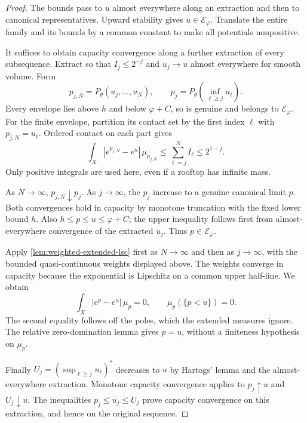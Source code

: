 \begin{proof}
The bounds pass to $u$ almost everywhere along an extraction and then to canonical representatives. Upward stability gives $u\in\mathcal E_\varphi$. Translate the entire family and its bounds by a common constant to make all potentials nonpositive.

It suffices to obtain capacity convergence along a further extraction of every subsequence. Extract so that $I_j\leq2^{-j}$ and $u_j\to u$ almost everywhere for smooth volume. Form
\[
 p_{j,N}=P_\theta(u_j,\ldots,u_N),\qquad
 p_j=P_\theta\left(\inf_{\ell\geq j}u_\ell\right).
\]
Every envelope lies above $h$ and below $\varphi+C$, so is genuine and belongs to $\mathcal E_\varphi$. For the finite envelope, partition its contact set by the first index $\ell$ with $p_{j,N}=u_\ell$. Ordered contact on each part gives
\[
 \int_X|e^{p_{j,N}}-e^u|\,\mu_{p_{j,N}}
 \leq\sum_{\ell=j}^N I_\ell\leq2^{1-j}.
\]
Only positive integrals are used here, even if a rooftop has infinite mass.

As $N\to\infty$, $p_{j,N}\downarrow p_j$. As $j\to\infty$, the $p_j$ increase to a genuine canonical limit $p$. Both convergences hold in capacity by monotone truncation with the fixed lower bound $h$. Also $h\leq p\leq u\leq\varphi+C$; the upper inequality follows first from almost-everywhere convergence of the extracted $u_j$. Thus $p\in\mathcal E_\varphi$.

Apply \cref{lem:weighted-extended-lsc} first as $N\to\infty$ and then as $j\to\infty$, with the bounded quasi-continuous weights displayed above. The weights converge in capacity because the exponential is Lipschitz on a common upper half-line. We obtain
\[
 \int_X|e^p-e^u|\,\mu_p=0,
 \qquad \mu_p(\{p<u\})=0.
\]
The second equality follows off the poles, which the extended measures ignore. The relative zero-domination lemma gives $p=u$, without a finiteness hypothesis on $\mu_p$.

Finally $U_j=(\sup_{\ell\geq j}u_\ell)^*$ decreases to $u$ by Hartogs' lemma and the almost-everywhere extraction. Monotone capacity convergence applies to $p_j\uparrow u$ and $U_j\downarrow u$. The inequalities $p_j\leq u_j\leq U_j$ prove capacity convergence on this extraction, and hence on the original sequence.
\end{proof}

